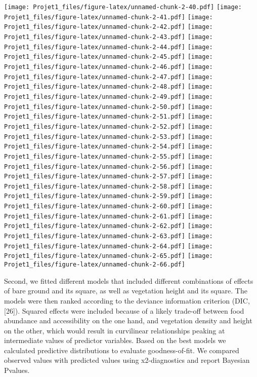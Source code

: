 \documentclass[
]{article}
\begin{document}
\texttt{[image: Projet1\_files/figure-latex/unnamed-chunk-2-40.pdf]}
\texttt{[image: Projet1\_files/figure-latex/unnamed-chunk-2-41.pdf]}
\texttt{[image: Projet1\_files/figure-latex/unnamed-chunk-2-42.pdf]}
\texttt{[image: Projet1\_files/figure-latex/unnamed-chunk-2-43.pdf]}
\texttt{[image: Projet1\_files/figure-latex/unnamed-chunk-2-44.pdf]}
\texttt{[image: Projet1\_files/figure-latex/unnamed-chunk-2-45.pdf]}
\texttt{[image: Projet1\_files/figure-latex/unnamed-chunk-2-46.pdf]}
\texttt{[image: Projet1\_files/figure-latex/unnamed-chunk-2-47.pdf]}
\texttt{[image: Projet1\_files/figure-latex/unnamed-chunk-2-48.pdf]}
\texttt{[image: Projet1\_files/figure-latex/unnamed-chunk-2-49.pdf]}
\texttt{[image: Projet1\_files/figure-latex/unnamed-chunk-2-50.pdf]}
\texttt{[image: Projet1\_files/figure-latex/unnamed-chunk-2-51.pdf]}
\texttt{[image: Projet1\_files/figure-latex/unnamed-chunk-2-52.pdf]}
\texttt{[image: Projet1\_files/figure-latex/unnamed-chunk-2-53.pdf]}
\texttt{[image: Projet1\_files/figure-latex/unnamed-chunk-2-54.pdf]}
\texttt{[image: Projet1\_files/figure-latex/unnamed-chunk-2-55.pdf]}
\texttt{[image: Projet1\_files/figure-latex/unnamed-chunk-2-56.pdf]}
\texttt{[image: Projet1\_files/figure-latex/unnamed-chunk-2-57.pdf]}
\texttt{[image: Projet1\_files/figure-latex/unnamed-chunk-2-58.pdf]}
\texttt{[image: Projet1\_files/figure-latex/unnamed-chunk-2-59.pdf]}
\texttt{[image: Projet1\_files/figure-latex/unnamed-chunk-2-60.pdf]}
\texttt{[image: Projet1\_files/figure-latex/unnamed-chunk-2-61.pdf]}
\texttt{[image: Projet1\_files/figure-latex/unnamed-chunk-2-62.pdf]}
\texttt{[image: Projet1\_files/figure-latex/unnamed-chunk-2-63.pdf]}
\texttt{[image: Projet1\_files/figure-latex/unnamed-chunk-2-64.pdf]}
\texttt{[image: Projet1\_files/figure-latex/unnamed-chunk-2-65.pdf]}
\texttt{[image: Projet1\_files/figure-latex/unnamed-chunk-2-66.pdf]}

Second, we fitted different models that included different combinations
of effects of bare ground and its square, as well as vegetation height
and its square. The models were then ranked according to the deviance
information criterion (DIC, {[}26{]}). Squared effects were included
because of a likely trade-off between food abundance and accessibility
on the one hand, and vegetation density and height on the other, which
would result in curvilinear relationships peaking at intermediate values
of predictor variables. Based on the best models we calculated
predictive distributions to evaluate goodness-of-fit. We compared
observed values with predicted values using x2-diagnostics and report
Bayesian Pvalues.
\end{document}
